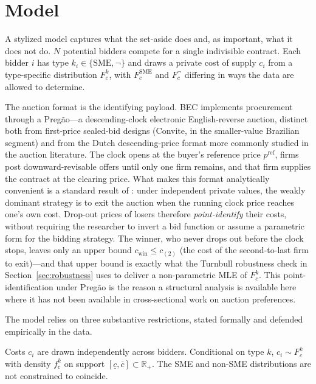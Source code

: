 \section{Model}\label{sec:model}

A stylized model captures what the set-aside does and, as important, what it does not do. $N$ potential bidders compete for a single indivisible contract. Each bidder $i$ has type $k_i \in \{\text{SME}, \neg\}$ and draws a private cost of supply $c_i$ from a type-specific distribution $F_c^k$, with $F_c^{\text{SME}}$ and $F_c^{\neg}$ differing in ways the data are allowed to determine.

The auction format is the identifying payload. BEC implements procurement through a Preg\~ao---a descending-clock electronic English-reverse auction, distinct both from first-price sealed-bid designs (Convite, in the smaller-value Brazilian segment) and from the Dutch descending-price format more commonly studied in the auction literature. The clock opens at the buyer's reference price $p^{\mathrm{ref}}$, firms post downward-revisable offers until only one firm remains, and that firm supplies the contract at the clearing price. What makes this format analytically convenient is a standard result of \citet{haile2003}: under independent private values, the weakly dominant strategy is to exit the auction when the running clock price reaches one's own cost. Drop-out prices of losers therefore \emph{point-identify} their costs, without requiring the researcher to invert a bid function or assume a parametric form for the bidding strategy. The winner, who never drops out before the clock stops, leaves only an upper bound $c_{\text{win}} \le c_{(2)}$ (the cost of the second-to-last firm to exit)---and that upper bound is exactly what the Turnbull robustness check in Section~\ref{sec:robustness} uses to deliver a non-parametric MLE of $F_c^k$. This point-identification under Preg\~ao is the reason a structural analysis is available here where it has not been available in cross-sectional work on auction preferences.

The model relies on three substantive restrictions, stated formally and defended empirically in the data.

\begin{assumption}\label{a:ipv}
Costs $c_i$ are drawn independently across bidders. Conditional on type $k$, $c_i \sim F_c^k$ with density $f_c^k$ on support $[\underline{c}, \overline{c}] \subset \mathbb{R}_+$. The SME and non-SME distributions are not constrained to coincide.
\end{assumption}

